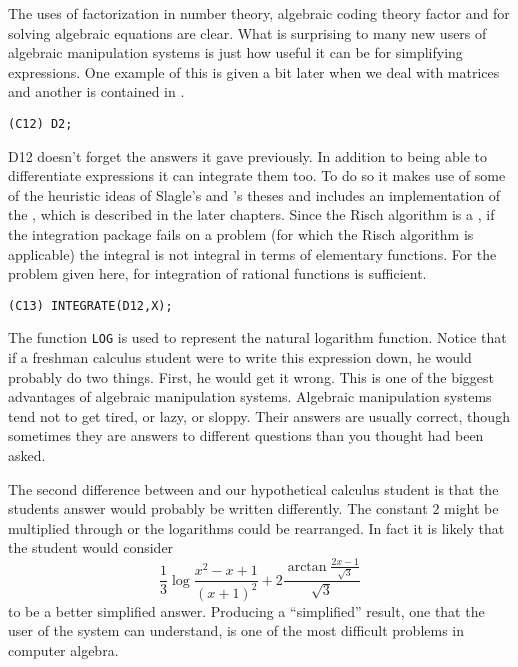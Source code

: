 The uses of factorization in number theory, algebraic coding theory
factor and for solving algebraic equations are clear.  What is
surprising to many new users of algebraic manipulation systems is just
how useful it can be for simplifying expressions.  One example of this
is given a bit later when we deal with matrices and another is
contained in .
\begin{verbatim}
(C12) D2;
\end{verbatim}
 {D12} 
{\Macsyma} doesn't forget the answers it gave previously.  In addition
to being able to differentiate expressions it can integrate them too.
To do so it makes use of some of the heuristic ideas of Slagle's \cite{Slagle1963-dt} and
{\MosesJ}'s theses \cite{Moses1968-oq} and includes an
implementation of the , which is described in
the later chapters.  Since the Risch algorithm is a , if the integration package fails on a problem (for which
the Risch algorithm is applicable) the integral is not integral in
terms of elementary functions.  For the problem given here,
 for integration of rational functions is
sufficient.
\begin{verbatim}
(C13) INTEGRATE(D12,X);
\end{verbatim}
The function {\tt LOG} is used to represent the natural logarithm function.
Notice that if a freshman calculus student were to write this expression
down, he would probably do two things.  First, he would get it wrong.  This
is one of the biggest advantages of algebraic manipulation systems.
Algebraic manipulation systems tend not to get tired, or lazy, or
sloppy.  Their answers are usually correct, though sometimes they are
answers to different questions than you thought had been asked.

The second difference between {\Macsyma} and our hypothetical calculus
student is that the students answer would probably be written differently.
The constant $2$ might be multiplied through or the logarithms could be
rearranged.  In fact it is likely that the student would consider 
\[
\frac{1}{3} \log \frac{x^2 - x + 1}{(x+1)^2} 
+ 2 \frac{\arctan \frac{2 x - 1}{\sqrt{3}} }{\sqrt{3}}
\]
to be a better simplified answer.  Producing a ``simplified'' result, one
that the user of the system can understand, is one of the most difficult
problems in computer algebra.  

